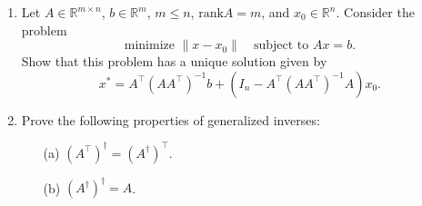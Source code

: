 \documentclass{article}
\begin{document}
\begin{enumerate}
\item Let $A \in \mathbb{R}^{m \times n}$, $b \in \mathbb{R}^m$, $m \leq n$, $\text{rank} A = m$, and $x_0 \in \mathbb{R}^n$. Consider the problem
\[
\text{minimize } \|x - x_0\| \quad \text{subject to } Ax = b.
\]
Show that this problem has a unique solution given by
\[
x^* = A^\top \left( AA^\top \right)^{-1} b + \left( I_n - A^\top \left( AA^\top \right)^{-1} A \right) x_0.
\]

\item Prove the following properties of generalized inverses:
\begin{enumerate}
    \item[(a)] $(A^\top)^\dagger = (A^\dagger)^\top$.
    \item[(b)] $(A^\dagger)^\dagger = A$.
\end{enumerate}

\end{enumerate}
\end{document}
